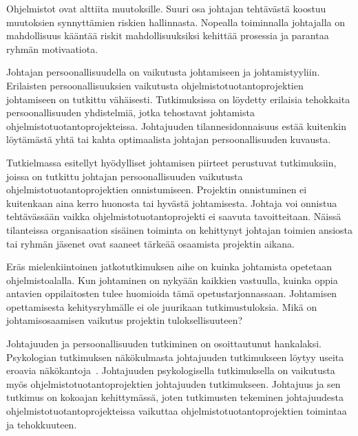 \documentclass[finnish]{tktltiki2}
\theoremstyle{definition}
\theoremstyle{remark}
\begin{document}
Ohjelmistot ovat alttiita muutoksille. Suuri osa johtajan tehtävästä koostuu muutoksien synnyttämien riskien hallinnasta. Nopealla toiminnalla johtajalla on mahdollisuus kääntää riskit mahdollisuuksiksi kehittää prosessia ja parantaa ryhmän motivaatiota.

Johtajan persoonallisuudella on vaikutusta johtamiseen ja johtamistyyliin. Erilaisten persoonallisuuksien vaikutusta ohjelmistotuotantoprojektien johtamiseen on tutkittu vähäisesti. Tutkimuksissa on löydetty erilaisia tehokkaita persoonallisuuden yhdistelmiä, jotka tehostavat johtamista ohjelmistotuotantoprojekteissa. Johtajuuden tilannesidonnaisuus estää kuitenkin löytämästä yhtä tai kahta optimaalista johtajan persoonallisuuden kuvausta.

Tutkielmassa esitellyt hyödylliset johtamisen piirteet perustuvat tutkimuksiin, joissa on tutkittu johtajan persoonallisuuden vaikutusta ohjelmistotuotantoprojektien onnistumiseen. Projektin onnistuminen ei kuitenkaan aina kerro huonosta tai hyvästä johtamisesta. Johtaja voi onnistua tehtävässään vaikka ohjelmistotuotantoprojekti ei saavuta tavoitteitaan. Näissä tilanteissa organisaation sisäinen toiminta on kehittynyt johtajan toimien ansiosta tai ryhmän jäsenet ovat saaneet tärkeää osaamista projektin aikana.

Eräs mielenkiintoinen jatkotutkimuksen aihe on kuinka johtamista opetetaan ohjelmistoalalla. Kun johtaminen on nykyään kaikkien vastuulla, kuinka oppia antavien oppilaitosten tulee huomioida tämä opetustarjonnassaan. Johtamisen opettamisesta kehitysryhmälle ei ole juurikaan tutkimustuloksia. Mikä on johtamisosaamisen vaikutus projektin tuloksellisuuteen?

Johtajuuden ja persoonallisuuden tutkiminen on osoittautunut hankalaksi. Psykologian tutkimuksen näkökulmasta johtajuuden tutkimukseen löytyy useita eroavia näkökantoja~\cite{haslam2011}. Johtajuuden psykologisella tutkimuksella on vaikutusta myös ohjelmistotuotantoprojektien johtajuuden tutkimukseen. Johtajuus ja sen tutkimus on kokoajan kehittymässä, joten tutkimusten tekeminen johtajuudesta ohjelmistotuotantoprojekteissa vaikuttaa ohjelmistotuotantoprojektien toimintaa ja tehokkuuteen.   

   

\newpage 



 











%

%
% 
%



\end{document}
